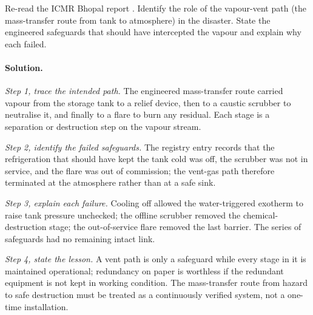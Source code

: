 \begin{exercise}
Re-read the ICMR Bhopal report \cite{acc:icmr-bhopal-2004}. Identify
the role of the vapour-vent path (the mass-transfer route from tank
to atmosphere) in the disaster. State the engineered safeguards
that should have intercepted the vapour and explain why each failed.

\paragraph{Solution.}
\textit{Step 1, trace the intended path.} The engineered mass-transfer
route carried vapour from the storage tank to a relief device, then to
a caustic scrubber to neutralise it, and finally to a flare to burn any
residual. Each stage is a separation or destruction step on the vapour
stream.

\textit{Step 2, identify the failed safeguards.} The registry entry
\cite{acc:icmr-bhopal-2004} records that the refrigeration that should
have kept the tank cold was off, the scrubber was not in service, and
the flare was out of commission; the vent-gas path therefore terminated
at the atmosphere rather than at a safe sink.

\textit{Step 3, explain each failure.} Cooling off allowed the
water-triggered exotherm to raise tank pressure unchecked; the offline
scrubber removed the chemical-destruction stage; the out-of-service
flare removed the last barrier. The series of safeguards had no
remaining intact link.

\textit{Step 4, state the lesson.} A vent path is only a safeguard while
every stage in it is maintained operational; redundancy on paper is
worthless if the redundant equipment is not kept in working condition.
The mass-transfer route from hazard to safe destruction must be treated
as a continuously verified system, not a one-time installation.
\end{exercise}

